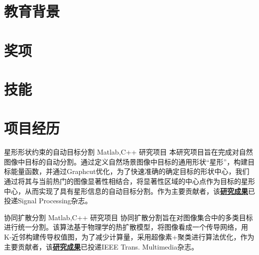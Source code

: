 \documentclass[11pt,a4paper,sans]{moderncv}   %
\title{}                     %
\begin{document}
\begin{CJK}{UTF8}{gbsn}                       %
\maketitle

\section{教育背景}

\section{奖项}

\section{技能}

\section{项目经历}
\renewcommand{\baselinestretch}{1.2}

{星形形状约束的自动目标分割}
{Matlab,C++}
{研究项目}{}
{本研究项目旨在完成对自然图像中目标的自动分割。通过定义自然场景图像中目标的通用形状“星形”，构建目标能量函数，并通过Graphcut优化，为了快速准确的确定目标的形状中心，我们通过将其与当前热门的图像显著性相结合，将显著性区域的中心点作为目标的星形中心，从而实现了具有星形信息的自动目标分割。作为主要贡献者，该\textbf{\href{http://files.cnblogs.com/moondark/XiangliLiao_SRAPC.pdf}{研究成果}}已投递Signal Processing杂志。}
\vspace*{0.2\baselineskip}

{协同扩散分割}
{Matlab,C++}
{研究项目}{}
{协同扩散分割旨在对图像集合中的多类目标进行统一分割。该算法基于物理学的热扩散模型，将图像看成一个传导网络，用K-近邻构建传导权值图，为了减少计算量，采用超像素+聚类进行算法优化，作为主要贡献者，该\textbf{\href{http://files.cnblogs.com/moondark/XiangliLiao_CoDiffusion.pdf}{研究成果}}已投递IEEE Trans. Multimedia杂志。}
\vspace*{0.2\baselineskip}


\end{CJK}
\end{document}
